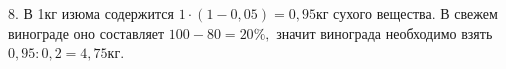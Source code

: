 8. В 1кг изюма содержится $1\cdot(1-0,05)=0,95$кг сухого вещества. В свежем винограде оно составляет $100-80=20\%,$ значит винограда необходимо взять $0,95:0,2=4,75$кг.\\
